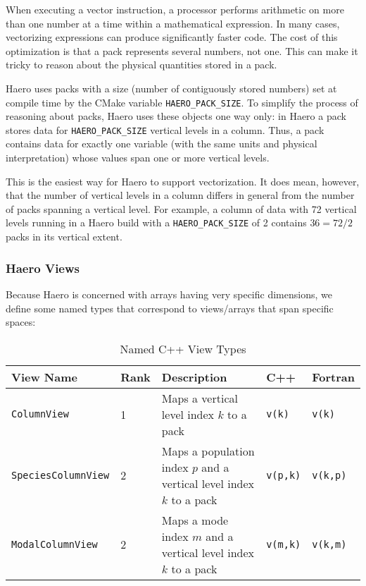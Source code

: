 When executing a vector instruction, a processor performs arithmetic on more
than one number at a time within a mathematical expression. In many cases,
vectorizing expressions can produce significantly faster code. The cost of this
optimization is that a pack represents several numbers, not one. This can make
it tricky to reason about the physical quantities stored in a pack.

Haero uses packs with a size (number of contiguously stored numbers) set at
compile time by the CMake variable \texttt{HAERO\_PACK\_SIZE}. To simplify the
process of reasoning about packs, Haero uses these objects one way only:
in Haero a pack stores data for \texttt{HAERO\_PACK\_SIZE} vertical levels in
a column. Thus, a pack contains data for exactly one variable (with the same
units and physical interpretation) whose values span one or more vertical
levels.

This is the easiest way for Haero to support vectorization. It does mean,
however, that the number of vertical levels in a column differs in general from
the number of packs spanning a vertical level. For example, a column of data
with 72 vertical levels running in a Haero build with a \texttt{HAERO\_PACK\_SIZE}
of 2 contains $36 = 72 / 2 $ packs in its vertical extent.

\subsubsection*{Haero Views}

Because Haero is concerned with arrays having very specific dimensions, we
define some named types that correspond to views/arrays that span specific
spaces:

\begin{table}[htbp]
\centering
\caption{Named C++ View Types}
\label{tab:viewtypes}
\begin{tabular}{|l|l|p{6cm}|l|l|}
  \toprule
  View Name & Rank & Description & C++ & Fortran \\
  \midrule
  \texttt{ColumnView} & 1 & Maps a vertical level index $k$ to a pack & \texttt{v(k)} & \texttt{v(k)} \\
  \texttt{SpeciesColumnView} & 2 & Maps a population index $p$ and a vertical level index $k$ to a pack & \texttt{v(p,k)}  & \texttt{v(k,p)} \\
  \texttt{ModalColumnView} & 2 & Maps a mode index $m$ and a vertical level index $k$ to a pack & \texttt{v(m,k)}  & \texttt{v(k,m)} \\
  \bottomrule
\end{tabular}
\end{table}

